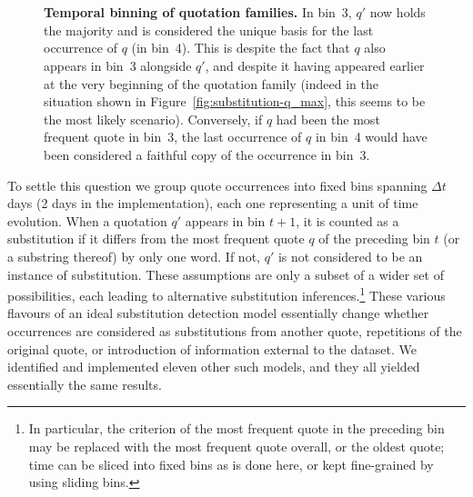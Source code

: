 \begin{figure}[h]
    \centering
	\hfill \\
	\hfill \\
	\subfloat[XXXX]{
	    \def\svgwidth{\linewidth}
	    \small
	    
	    \label{fig:substitution-q_max}
	}
	\caption{{\bf Temporal binning of quotation families.} In bin~3, $q'$ now holds the majority and is considered the unique basis for the last occurrence of $q$ (in bin~4). This is despite the fact that $q$ also appears in bin~3 alongside $q'$, and despite it having appeared earlier at the very beginning of the quotation family (indeed in the situation shown in Figure~\ref{fig:substitution-q_max}, this seems to be the most likely scenario). Conversely, if $q$ had been the most frequent quote in bin~3, the last occurrence of $q$ in bin~4 would have been considered a faithful copy of the occurrence in bin~3.}
    \label{fig:substitution-temporal-binning}
\end{figure}

To settle this question we group quote occurrences into fixed bins spanning $\Delta t$ days (2 days in the implementation), each one representing a unit of time evolution.
When a quotation $q'$ appears in bin $t+1$, it is counted as a substitution if it differs from the most frequent quote $q$ of the preceding bin $t$ (or a substring thereof) by only one word. If not, $q'$ is not considered to be an instance of substitution.  %
These assumptions are only a subset of a wider set of possibilities, each leading to alternative substitution inferences.\footnote{In particular, the criterion of the most frequent quote in the preceding bin may be replaced with the most frequent quote overall, or the oldest quote; time can be sliced into fixed bins as is done here, or kept fine-grained by using sliding bins.}
These various flavours of an ideal substitution detection model essentially change whether occurrences are considered as substitutions from another quote, repetitions of the original quote, or introduction of information external to the dataset.
We identified and implemented eleven other such models, and they all yielded essentially the same results.

